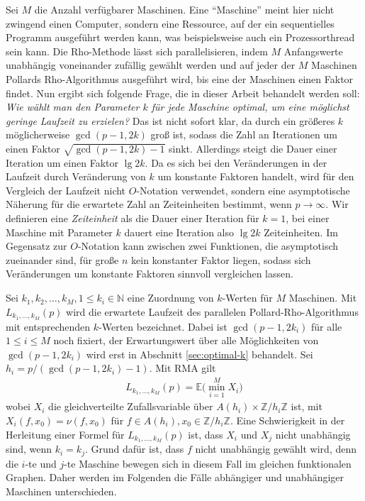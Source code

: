 \documentclass[a4paper, 10pt, ngerman]{article}
\newcommand{\E}{\mathbb{E}}
\newcommand{\N}{\mathbb{N}}
\newcommand{\Z}{\mathbb{Z}}
\begin{document}
Sei $M$ die Anzahl verfügbarer Maschinen. Eine "`Maschine"'  meint hier nicht zwingend einen Computer, sondern eine Ressource, auf der ein sequentielles Programm ausgeführt werden kann, was beispielsweise auch ein Prozessorthread sein kann. Die Rho-Methode lässt sich parallelisieren, indem $M$ Anfangswerte unabhängig voneinander zufällig gewählt werden und auf jeder der $M$ Maschinen Pollards Rho-Algorithmus ausgeführt wird, bis eine der Maschinen einen Faktor findet. Nun ergibt sich folgende Frage, die in dieser Arbeit behandelt werden soll: \emph{Wie wählt man den Parameter $k$ für jede Maschine optimal, um eine möglichst geringe Laufzeit zu erzielen?} Das ist nicht sofort klar, da durch ein größeres $k$ möglicherweise $\gcd(p - 1, 2k)$ groß ist, sodass die Zahl an Iterationen um einen Faktor $\sqrt{\gcd(p - 1, 2k) -1}$ sinkt. Allerdings steigt die Dauer einer Iteration um einen Faktor $\lg 2k$. Da es sich bei den Veränderungen in der Laufzeit durch Veränderung von $k$ um konstante Faktoren handelt, wird für den Vergleich der Laufzeit nicht $O$-Notation verwendet, sondern eine asymptotische Näherung für die erwartete Zahl an Zeiteinheiten bestimmt, wenn $p \to \infty$. Wir definieren eine \emph{Zeiteinheit} als die Dauer einer Iteration für $k = 1$, bei einer Maschine mit Parameter $k$ dauert eine Iteration also $\lg 2k$ Zeiteinheiten. Im Gegensatz zur $O$-Notation kann zwischen zwei Funktionen, die asymptotisch zueinander sind, für große $n$ kein konstanter Faktor liegen, sodass sich Veränderungen um konstante Faktoren sinnvoll vergleichen lassen.

Sei $k_1, k_2, \dots, k_M, 1 \le k_i \in \N$ eine Zuordnung von $k$-Werten für $M$ Maschinen. Mit $L_{k_1, \dots, k_M}(p)$ wird die erwartete Laufzeit des parallelen Pollard-Rho-Algorithmus mit entsprechenden $k$-Werten bezeichnet. Dabei ist $\gcd(p - 1, 2k_i)$ für alle $1 \le i \le M$ noch fixiert, der Erwartungswert über alle Möglichkeiten von $\gcd(p - 1, 2k_i)$ wird erst in Abschnitt \ref{sec:optimal-k} behandelt. Sei $h_i = p/(\gcd(p - 1, 2k_i) - 1)$. Mit RMA gilt
\begin{align}
    L_{k_1, \dots, k_M}(p) = \E \bigg ( \min_{i = 1}^M X_i \bigg )
    \label{lk-definition}
\end{align}
wobei $X_i$ die gleichverteilte Zufallsvariable über $A(h_i) \times \Z/h_i\Z$ ist, mit $X_i(f, x_0) = \nu(f, x_0)$ für $f \in A(h_i), x_0 \in \Z/h_i\Z$. Eine Schwierigkeit in der Herleitung einer Formel für $L_{k_1, \dots, k_M}(p)$ ist, dass $X_i$ und $X_j$ nicht unabhängig sind, wenn $k_i = k_j$. Grund dafür ist, dass $f$ nicht unabhängig gewählt wird, denn die $i$-te und $j$-te Maschine bewegen sich in diesem Fall im gleichen funktionalen Graphen.  Daher werden im Folgenden die Fälle abhängiger und unabhängiger Maschinen unterschieden.
\end{document}
